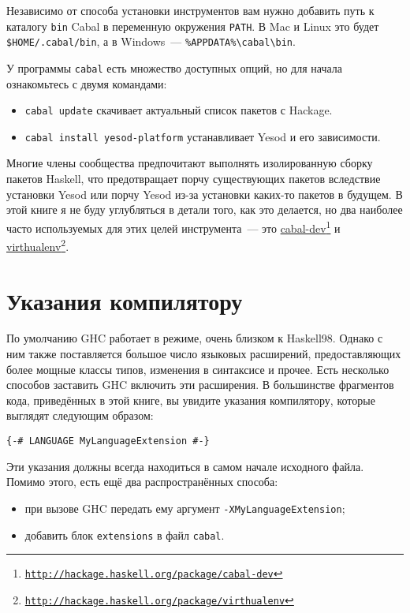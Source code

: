 Независимо от способа установки инструментов вам нужно добавить путь к каталогу \texttt{bin} Cabal в переменную окружения \texttt{PATH}. В Mac и Linux это будет \texttt{\$HOME/.cabal/bin}, а в Windows~--- \texttt{\%APPDATA\%\textbackslash{}cabal\textbackslash{}bin}.

У программы \texttt{cabal} есть множество доступных опций, но для начала ознакомьтесь с двумя командами:

\begin{itemize}
  \item \texttt{cabal update} скачивает актуальный список пакетов с Hackage.
  \item \texttt{cabal install yesod-platform} устанавливает Yesod и его зависимости.
\end{itemize}

\begin{remark}
Многие члены сообщества предпочитают выполнять изолированную сборку пакетов Haskell, что предотвращает порчу существующих пакетов вследствие установки Yesod или порчу Yesod из-за установки каких-то пакетов в будущем. В этой книге я не буду углубляться в детали того, как это делается, но два наиболее часто используемых для этих целей инструмента~--- это \href{http://hackage.haskell.org/package/cabal-dev}{cabal-dev}\footnote{\href{http://hackage.haskell.org/package/cabal-dev}{\texttt{http://hackage.haskell.org/package/cabal-dev}}} и \href{http://hackage.haskell.org/package/virthualenv}{virthualenv}\footnote{\href{http://hackage.haskell.org/package/virthualenv}{\texttt{http://hackage.haskell.org/package/virthualenv}}}.
\end{remark}

\section{Указания компилятору}

По умолчанию GHC работает в режиме, очень близком к Haskell98. Однако с ним также поставляется большое число языковых расширений, предоставляющих более мощные классы типов, изменения в синтаксисе и прочее. Есть несколько способов заставить GHC включить эти расширения. В большинстве фрагментов кода, приведённых в этой книге, вы увидите указания компилятору, которые выглядят следующим образом:

\begin{lstlisting}
{-# LANGUAGE MyLanguageExtension #-}
\end{lstlisting}

Эти указания должны всегда находиться в самом начале исходного файла. Помимо этого, есть ещё два распространённых способа:
\begin{itemize}
\item при вызове GHC передать ему аргумент \lstinline'-XMyLanguageExtension';
\item добавить блок \texttt{extensions} в файл \texttt{cabal}.
\end{itemize}

